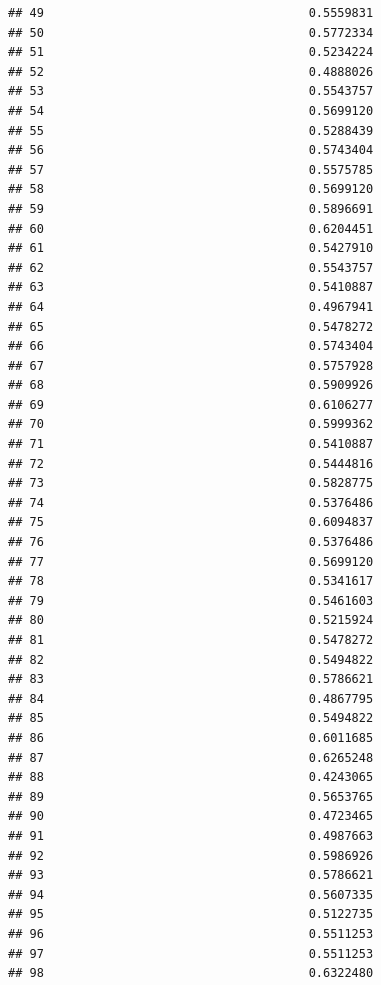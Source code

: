 \documentclass[
  american,
  man,floatsintext]{apa7}
\begin{document}
\begin{verbatim}
## 49                                     0.5559831
## 50                                     0.5772334
## 51                                     0.5234224
## 52                                     0.4888026
## 53                                     0.5543757
## 54                                     0.5699120
## 55                                     0.5288439
## 56                                     0.5743404
## 57                                     0.5575785
## 58                                     0.5699120
## 59                                     0.5896691
## 60                                     0.6204451
## 61                                     0.5427910
## 62                                     0.5543757
## 63                                     0.5410887
## 64                                     0.4967941
## 65                                     0.5478272
## 66                                     0.5743404
## 67                                     0.5757928
## 68                                     0.5909926
## 69                                     0.6106277
## 70                                     0.5999362
## 71                                     0.5410887
## 72                                     0.5444816
## 73                                     0.5828775
## 74                                     0.5376486
## 75                                     0.6094837
## 76                                     0.5376486
## 77                                     0.5699120
## 78                                     0.5341617
## 79                                     0.5461603
## 80                                     0.5215924
## 81                                     0.5478272
## 82                                     0.5494822
## 83                                     0.5786621
## 84                                     0.4867795
## 85                                     0.5494822
## 86                                     0.6011685
## 87                                     0.6265248
## 88                                     0.4243065
## 89                                     0.5653765
## 90                                     0.4723465
## 91                                     0.4987663
## 92                                     0.5986926
## 93                                     0.5786621
## 94                                     0.5607335
## 95                                     0.5122735
## 96                                     0.5511253
## 97                                     0.5511253
## 98                                     0.6322480

\end{verbatim}
\end{document}
